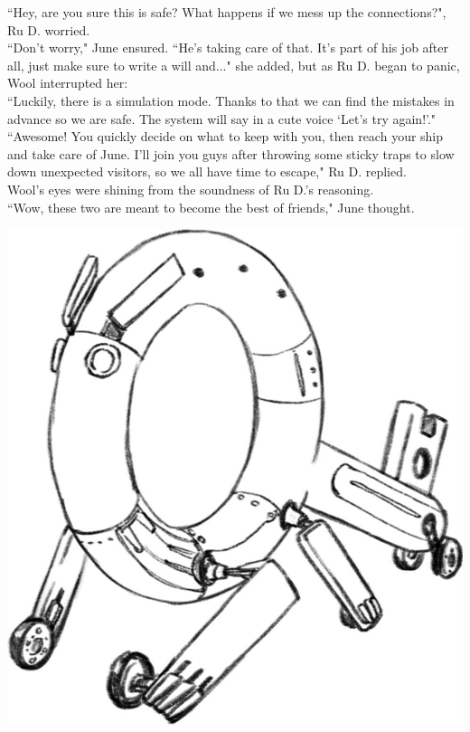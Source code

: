 ``Hey, are you sure this is safe? What happens if we mess up the connections?", Ru D. worried.\\
``Don't worry," June ensured. ``He's taking care of that. It's part of his job after all, just make sure to write a will and..." she added, but as Ru D. began to panic, Wool interrupted her:\\
``Luckily, there is a simulation mode. Thanks to that we can find the mistakes in advance so we are safe. The system will say in a cute voice `Let's try again!'."\\
``Awesome! You quickly decide on what to keep with you, then reach your ship and take care of June. I'll join you guys after throwing some sticky traps to slow down unexpected visitors, so we all have time to escape,"  Ru D. replied.\\
Wool's eyes were shining from the soundness of Ru D.'s reasoning. \\
``Wow, these two are meant to become the best of friends," June thought.

\begin{center}
    \includegraphics[height=.2\textheight]{Assets/wfbw_ninja}    
\end{center}

